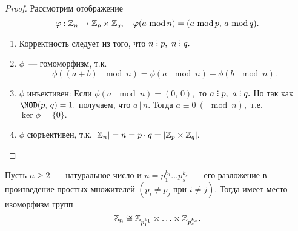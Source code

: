 	\begin{proof}
		Рассмотрим отображение
		\begin{equation*}
			\varphi: \mathbb{Z}_n \rightarrow \mathbb{Z}_p \times \mathbb{Z}_q, \quad \varphi(a \ \mathrm{mod} \, n) = (a \ \mathrm{mod} \, p, \, a \ \mathrm{mod} \, q).
		\end{equation*}
		\begin{enumerate}
			\setlength\itemsep{0.1em}
			\item Корректность следует из того, что $n \divby p, \ n \divby q.$
			\item $\phi$~--- гомоморфизм, т.к.
			\begin{equation*}
				\phi((a + b) \ \mod n) = \phi(a \ \mod n) + \phi(b \ \mod n).
			\end{equation*}
			\item $\phi$ инъективен: \n
			Если ${\phi(a \ \mod n) =(0, \, 0),}$ то ${a \divby p, \ a \divby q.}$ Но так как ${\NOD(p, \, q) = 1,}$ \n
			получаем, что $a \, | \, n.$ Тогда ${a \equiv 0 \ (\mod n),}$ т.е. ${\ker \phi = \{0\}.}$
			\item $\phi$ сюръективен, т.к. ${|\mathbb{Z}_n| = n = p \cdot q = |\mathbb{Z}_p \times \mathbb{Z}_q|.}$ \qedhere
		\end{enumerate}
	\end{proof}
	\begin{consequence*}
		Пусть ${n \geqslant 2}$~--- натуральное число и ${n = p^{k_1}_1 \ldots p^{k_s}_s}$~--- его разложение в произведение простых множителей ${(p_i \neq p_j \text{ при } i \neq j).}$ Тогда имеет место изоморфизм групп
		\begin{equation*}
			\mathbb{Z}_n \cong \mathbb{Z}_{p^{k_1}_1} \times \ldots \times \mathbb{Z}_{p^{k_s}_s}.
		\end{equation*}
	\end{consequence*}